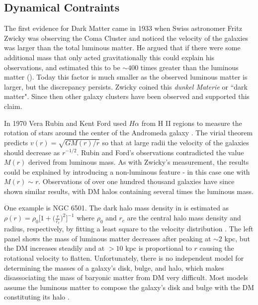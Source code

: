\subsection{Dynamical Contraints} \label{subsec:dynamics}
The first evidence for Dark Matter came in 1933 when Swiss astronomer Fritz Zwicky was observing the Coma Cluster
and noticed the velocity of the galaxies was larger than the total luminous matter.  He argued that if there were
some additional mass that only acted gravitationally this could explain his observations, and estimated this
to be $\sim 400$ times greater than the luminous matter ().  Today this factor is much
smaller as the observed luminous matter is larger, but the discrepancy persists.  Zwicky coined this
\textit{dunkel Materie} or ``dark matter".  Since then other galaxy clusters have been observed and supported
this claim.

In 1970 Vera Rubin and Kent Ford used $H\alpha$ from H II regions to measure the rotation of stars around the
center of the Andromeda galaxy .  The virial theorem predicts $v(r) = \sqrt{GM(r)/r}$ so
that at large radii the velocity of the galaxies should decrease as $r^{-1/2}$.  Rubin and Ford's observations
contradicted the value $M(r)$ derived from luminous mass.  As with Zwicky's measurement, the results could be
explained by introducing a non-luminous feature - in this case one with $M(r) \sim r$.  Observations of over
one hundred thousand galaxies have since shown similar results, with DM halos containing several times the
luminous mass.

One example is NGC 6501.  The dark halo mass density in  is estimated as
$\rho (r) = \rho_{0} \Big[ 1 + \Big( \frac{r}{r_{c}} \Big)^{2} \Big]^{-1}$ where $\rho_{0}$ and $r_{c}$
are the central halo mass density and radius, respectively, by fitting a least square to the velocity
distribution .  The left panel shows the mass of luminous matter decreases after
peaking at $\sim2$ kpc, but the DM increases steadily and at $>10$ kpc is proportional to $r$ causing
the rotational velocity to flatten.  Unfortunately, there is no independent model for determining the
masses of a galaxy's disk, bulge, and halo, which makes disassociating the mass of baryonic matter from
DM very difficult.  Most models assume the luminous matter to compose the galaxy's disk and bulge with
the DM constituting its halo .



